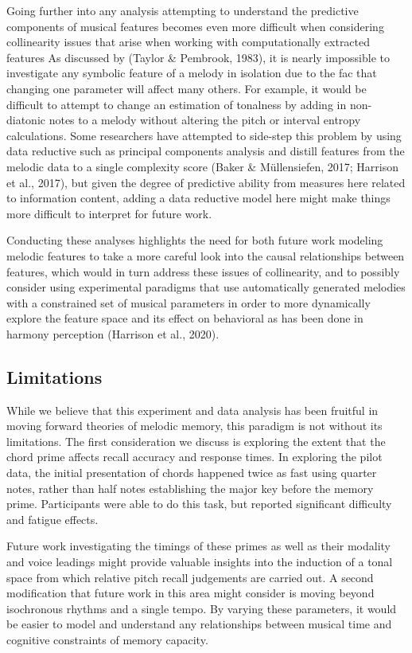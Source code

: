 \documentclass[english,man,floatsintext]{apa6}
\begin{document}
Going further into any analysis attempting to understand the predictive components of musical features becomes even more difficult when considering collinearity issues that arise when working with computationally extracted features As discussed by (Taylor \& Pembrook, 1983), it is nearly impossible to investigate any symbolic feature of a melody in isolation due to the fac that changing one parameter will affect many others.
For example, it would be difficult to attempt to change an estimation of tonalness by adding in non-diatonic notes to a melody without altering the pitch or interval entropy calculations.
Some researchers have attempted to side-step this problem by using data reductive such as principal components analysis and distill features from the melodic data to a single complexity score (Baker \& Müllensiefen, 2017; Harrison et al., 2017), but given the degree of predictive ability from measures here related to information content, adding a data reductive model here might make things more difficult to interpret for future work.

Conducting these analyses highlights the need for both future work modeling melodic features to take a more careful look into the causal relationships between features, which would in turn address these issues of collinearity, and to possibly consider using experimental paradigms that use automatically generated melodies with a constrained set of musical parameters in order to more dynamically explore the feature space and its effect on behavioral as has been done in harmony perception (Harrison et al., 2020).

\hypertarget{limitations}{%
\subsection{Limitations}\label{limitations}}

While we believe that this experiment and data analysis has been fruitful in moving forward theories of melodic memory, this paradigm is not without its limitations.
The first consideration we discuss is exploring the extent that the chord prime affects recall accuracy and response times.
In exploring the pilot data, the initial presentation of chords happened twice as fast using quarter notes, rather than half notes establishing the major key before the memory prime.
Participants were able to do this task, but reported significant difficulty and fatigue effects.

Future work investigating the timings of these primes as well as their modality and voice leadings might provide valuable insights into the induction of a tonal space from which relative pitch recall judgements are carried out.
A second modification that future work in this area might consider is moving beyond isochronous rhythms and a single tempo.
By varying these parameters, it would be easier to model and understand any relationships between musical time and cognitive constraints of memory capacity.
\end{document}

